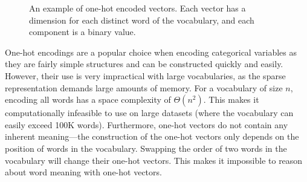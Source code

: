 \documentclass{paper}
\newcommand\Tstrut{\rule{0pt}{2.6ex}}         %
\newcommand\Bstrut{\rule[-0.9ex]{0pt}{0pt}}   %
\begin{document}
\begin{figure}[t]
    \centering
    \caption{An example of one-hot encoded vectors. Each vector has a dimension for each distinct word of the vocabulary, and each component is a binary value.}
    \label{fig:one_hot_encoding}
\end{figure}

One-hot encodings are a popular choice when encoding categorical variables as they are fairly simple structures and can be constructed quickly and easily. However, their use is very impractical with large vocabularies, as the sparse representation demands large amounts of memory. For a vocabulary of size $n$, encoding all words has a space complexity of $\Theta(n^2)$. This makes it computationally infeasible to use on large datasets (where the vocabulary can easily exceed 100K words). Furthermore, one-hot vectors do not contain any inherent meaning---the construction of the one-hot vectors only depends on the position of words in the vocabulary. Swapping the order of two words in the vocabulary will change their one-hot vectors. This makes it impossible to reason about word meaning with one-hot vectors. 
\end{document}
